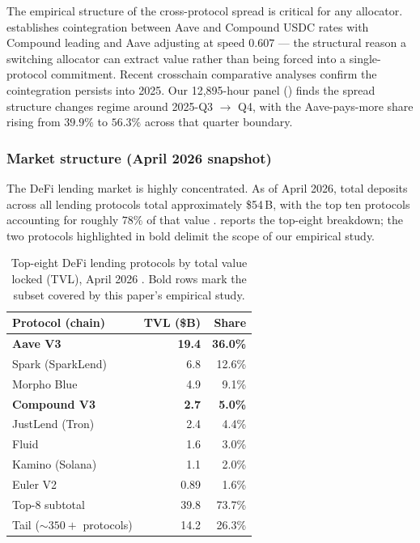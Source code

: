 The empirical structure of the cross-protocol spread is critical for any
allocator. \cite{gudgeon2020loanable} establishes cointegration between
Aave and Compound USDC rates with Compound leading and Aave adjusting at
speed $0.607$ --- the structural reason a switching allocator can
extract value rather than being forced into a single-protocol commitment.
Recent crosschain comparative analyses \cite{aavecompoundcrosschain2025}
confirm the cointegration persists into 2025.  Our 12,895-hour panel
() finds the spread structure changes
regime around 2025-Q3 $\to$ Q4, with the Aave-pays-more share rising from
$39.9\%$ to $56.3\%$ across that quarter boundary.

\subsubsection{Market structure (April 2026 snapshot)}
\label{sec:bg-market-structure}

The DeFi lending market is highly concentrated.  As of April 2026, total
deposits across all lending protocols total approximately
\$54\,B, with the top ten protocols accounting for roughly $78\%$ of
that value \cite{defillama2026snapshot}.   reports
the top-eight breakdown; the two protocols highlighted in bold delimit
the scope of our empirical study.

\begin{table}[t]
  \centering
  \caption{Top-eight DeFi lending protocols by total value locked (TVL),
           April 2026 \cite{defillama2026snapshot}.  Bold rows mark the
           subset covered by this paper's empirical study.}
  \label{tab:lending-tvl}
  \begin{tabular}{lrr}
    \toprule
    Protocol (chain)            & TVL (\$B) & Share \\
    \midrule
    \textbf{Aave V3}            & \textbf{19.4} & \textbf{36.0\%} \\
    Spark (SparkLend)           & 6.8           & 12.6\% \\
    Morpho Blue                 & 4.9           & 9.1\%  \\
    \textbf{Compound V3}        & \textbf{2.7}  & \textbf{5.0\%} \\
    JustLend (Tron)             & 2.4           & 4.4\%  \\
    Fluid                       & 1.6           & 3.0\%  \\
    Kamino (Solana)             & 1.1           & 2.0\%  \\
    Euler V2                    & 0.89          & 1.6\%  \\
    \midrule
    Top-8 subtotal              & 39.8          & 73.7\% \\
    Tail ($\sim 350+$ protocols)& 14.2          & 26.3\% \\
    \bottomrule
  \end{tabular}
\end{table}

